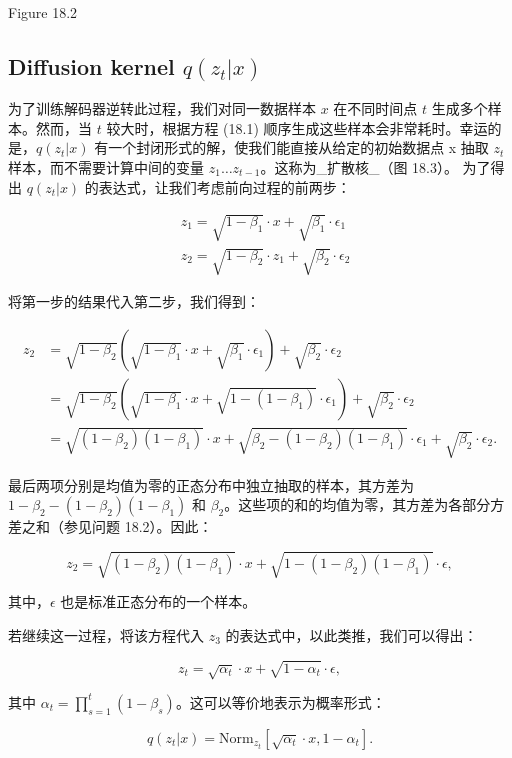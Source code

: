 Figure 18.2
\subsection{Diffusion kernel \(q(z_t|x)\)}
为了训练解码器逆转此过程，我们对同一数据样本 \(x\) 在不同时间点 \(t\) 生成多个样本。然而，当 \(t\) 较大时，根据方程 (18.1) 顺序生成这些样本会非常耗时。幸运的是，\(q(z_t|x)\) 有一个封闭形式的解，使我们能直接从给定的初始数据点 x 抽取 \(z_t\) 样本，而不需要计算中间的变量 \(z_1 \ldots z_{t-1}\)。这称为_扩散核_（图 18.3）。 为了得出 \(q(z_t|x)\) 的表达式，让我们考虑前向过程的前两步：


\begin{align}
&z_1 = \sqrt{1 - \beta_1} \cdot x + \sqrt{\beta_1} \cdot \epsilon_1 \\
&z_2 = \sqrt{1 - \beta_2} \cdot z_1 + \sqrt{\beta_2} \cdot \epsilon_2
\end{align} 


将第一步的结果代入第二步，我们得到：

\begin{align}
z_2 &= \sqrt{1 - \beta_2} \left( \sqrt{1 - \beta_1} \cdot x + \sqrt{\beta_1} \cdot \epsilon_1 \right) + \sqrt{\beta_2} \cdot \epsilon_2 \\
&= \sqrt{1 - \beta_2} \left( \sqrt{1 - \beta_1} \cdot x + \sqrt{1 - (1 - \beta_1)} \cdot \epsilon_1 \right) + \sqrt{\beta_2} \cdot \epsilon_2 \\
&= \sqrt{(1 - \beta_2)(1 - \beta_1)} \cdot x + \sqrt{\beta_2 - (1 - \beta_2)(1 - \beta_1)} \cdot \epsilon_1 + \sqrt{\beta_2} \cdot \epsilon_2.
\end{align} 


最后两项分别是均值为零的正态分布中独立抽取的样本，其方差为 \(1 - \beta_2 - (1 - \beta_2)(1 - \beta_1)\) 和 \(\beta_2\)。这些项的和的均值为零，其方差为各部分方差之和（参见问题 18.2）。因此：

\[
z_2 = \sqrt{(1 - \beta_2)(1 - \beta_1)} \cdot x + \sqrt{1 - (1 - \beta_2)(1 - \beta_1)} \cdot \epsilon, \tag{18.6}
\]

其中，\(\epsilon\) 也是标准正态分布的一个样本。


若继续这一过程，将该方程代入 \(z_3\) 的表达式中，以此类推，我们可以得出：

\[
z_t = \sqrt{\alpha_t} \cdot x + \sqrt{1 - \alpha_t} \cdot \epsilon, \tag{18.7}
\]

其中 \(\alpha_t = \prod_{s=1}^{t} (1 - \beta_s)\)。这可以等价地表示为概率形式：

\[
q(z_t|x) = \text{Norm}_{z_t} \left[ \sqrt{\alpha_t} \cdot x, 1 - \alpha_t \right]. \tag{18.8}
\]


